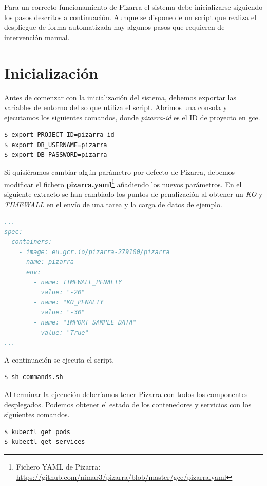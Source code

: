 \documentclass[11pt,spanish,listoffigures,listoftables]{tfgetsinf}
\begin{document}
Para un correcto funcionamiento de Pizarra el sistema debe inicializarse siguiendo los pasos descritos a continuación. Aunque se dispone de un script que realiza el despliegue de forma automatizada hay algunos pasos que requieren de intervención manual.

\section{Inicialización}

Antes de comenzar con la inicialización del sistema, debemos exportar las variables de entorno del \acrshort{so} que utiliza el script. Abrimos una consola y ejecutamos los siguientes comandos, donde \textit{pizarra-id} es el ID de proyecto en \acrfull{gce}.

\begin{lstlisting}[language=bash]
$ export PROJECT_ID=pizarra-id
$ export DB_USERNAME=pizarra
$ export DB_PASSWORD=pizarra
\end{lstlisting}

Si quisiéramos cambiar algún parámetro por defecto de Pizarra, debemos modificar el fichero \textbf{pizarra.yaml}\footnote{Fichero YAML de Pizarra: \url{https://github.com/nimar3/pizarra/blob/master/gce/pizarra.yaml}} añadiendo los nuevos parámetros. En el siguiente extracto se han cambiado los puntos de penalización al obtener un \textit{KO} y \textit{TIMEWALL} en el envío de una \Gls{tarea} y la carga de datos de ejemplo.

\begin{lstlisting}[language=yaml]
...
spec:
  containers:
    - image: eu.gcr.io/pizarra-279100/pizarra
      name: pizarra
      env:
        - name: TIMEWALL_PENALTY
          value: "-20"
        - name: "KO_PENALTY
          value: "-30"
        - name: "IMPORT_SAMPLE_DATA"
          value: "True"
...          
\end{lstlisting}

A continuación se ejecuta el script.

\begin{lstlisting}[language=bash]
$ sh commands.sh
\end{lstlisting}

Al terminar la ejecución deberíamos tener Pizarra con todos los componentes desplegados. Podemos obtener el estado de los contenedores y servicios con los siguientes comandos.

\begin{lstlisting}[language=bash]
$ kubectl get pods
$ kubectl get services
\end{lstlisting}
\end{document}
